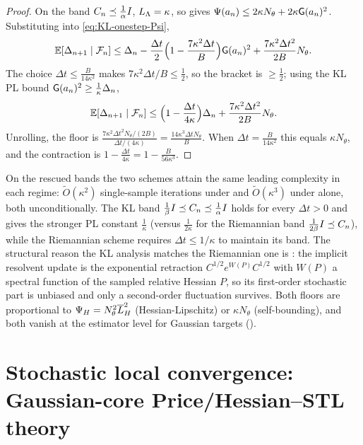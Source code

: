 \begin{proof}
On the band $C_n\preceq\tfrac1\alpha I$, $L_\Lambda=\kappa$, so  gives
$\Psi(a_n)\leq2\kappa N_\theta+2\kappa\mathsf{G}(a_n)^2$. Substituting into \eqref{eq:KL-onestep-Psi},
\[
    \mathbb{E}[\Delta_{n+1}\mid\mathcal{F}_n]
    \leq\Delta_n-\frac{\Delta t}2\Bigl(1-\frac{7\kappa^2\Delta t}B\Bigr)\mathsf{G}(a_n)^2+\frac{7\kappa^2\Delta t^2}{2B}N_\theta .
\]
The choice $\Delta t\leq\tfrac B{14\kappa^2}$ makes $7\kappa^2\Delta t/B\leq\tfrac12$, so the bracket is
$\geq\tfrac12$; using the KL PL bound $\mathsf{G}(a_n)^2\geq\tfrac1\kappa\Delta_n$,
\[
    \mathbb{E}[\Delta_{n+1}\mid\mathcal{F}_n]\leq\Bigl(1-\frac{\Delta t}{4\kappa}\Bigr)\Delta_n+\frac{7\kappa^2\Delta t^2}{2B}N_\theta .
\]
Unrolling, the floor is $\tfrac{7\kappa^2\Delta t^2N_\theta/(2B)}{\Delta t/(4\kappa)}=\tfrac{14\kappa^3\Delta t N_\theta}B$.
When $\Delta t=\tfrac B{14\kappa^2}$ this equals $\kappa N_\theta$, and the contraction is
$1-\tfrac{\Delta t}{4\kappa}=1-\tfrac B{56\kappa^3}$.
\end{proof}

\begin{remark}
\label{rem:KL-vs-Riem}
On the rescued bands the two schemes attain the same leading complexity in each regime:
$\widetilde O(\kappa^2)$ single-sample iterations under  and
$\widetilde O(\kappa^3)$ under  alone, both unconditionally. The KL band
$\tfrac1\beta I\preceq C_n\preceq\tfrac1\alpha I$ holds for every $\Delta t>0$ and gives the
stronger PL constant $\tfrac1\kappa$ (versus $\tfrac1{2\kappa}$ for the Riemannian band
$\tfrac1{2\beta}I\preceq C_n$), while the Riemannian scheme requires $\Delta t\leq1/\kappa$ to
maintain its band. The structural reason the KL analysis matches the Riemannian one is
: the implicit resolvent update is the exponential retraction
$C^{1/2}e^{W(P)}C^{1/2}$ with $W(P)$ a spectral function of the sampled relative Hessian $P$, so its
first-order stochastic part is unbiased and only a second-order fluctuation survives. Both floors are
proportional to $\Psi_H=N_\theta^2\overline{L}_H^2$ (Hessian-Lipschitz) or $\kappa N_\theta$ (self-bounding),
and both vanish at the estimator level for Gaussian targets ().
\end{remark}
\section{Stochastic local convergence: Gaussian-core Price/Hessian--STL theory}
\label{sec:stoch-local}

